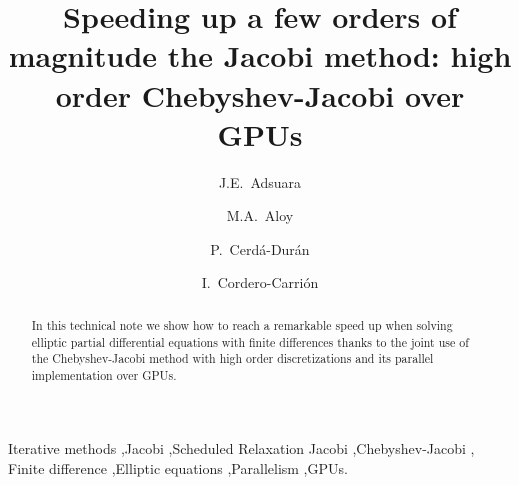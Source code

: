 \documentclass[preprint,12pt]{elsarticle}
\begin{document}
\begin{frontmatter}




\title{Speeding up a few orders of magnitude the Jacobi method: high order Chebyshev-Jacobi over GPUs}


\author{J.E.~Adsuara} 
\author{M.A.~Aloy}
\author{P.~Cerd\'a-Dur\'an}
\author{I.~Cordero-Carri\'on}
\address[label1]{Departamento de Astronom\'{\i}a y Astrof\'{\i}sica, Universidad de Valencia, E-46100, Burjassot, Spain.}
\address[label2]{Departamento de Matem\'aticas, Universidad de Valencia, E-46100, Burjassot, Spain.}

\begin{abstract}
In this technical note we show how to reach a remarkable speed up when solving elliptic partial differential equations with finite differences thanks to the joint use of the Chebyshev-Jacobi method with high order discretizations and its parallel implementation over GPUs.
\end{abstract}

\begin{keyword}
Iterative methods \sep Jacobi \sep Scheduled Relaxation Jacobi \sep Chebyshev-Jacobi \sep
Finite difference \sep Elliptic equations \sep Parallelism \sep GPUs.

\end{keyword}


\end{frontmatter}
\end{document}
